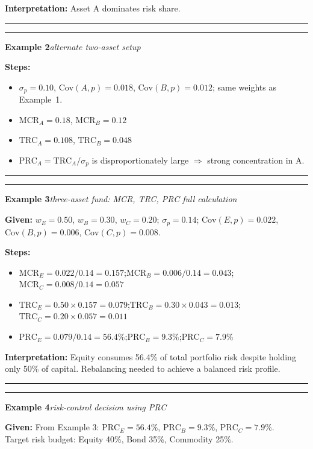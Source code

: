 \documentclass[
]{article}
\begin{document}
\noindent\textbf{Interpretation:} Asset A dominates risk share.

\noindent\rule{\linewidth}{0.4pt}
\medskip
\noindent\rule{\linewidth}{0.4pt}
\noindent\textbf{Example 2}\enspace\textit{alternate two-asset setup}

\noindent\textbf{Steps:}
\begin{itemize}\setlength{\itemsep}{3pt}
  \item $\sigma_p=0.10$,\; $\text{Cov}(A,p)=0.018$,\; $\text{Cov}(B,p)=0.012$; same weights as Example~1.
  \item $\text{MCR}_A=0.18$,\; $\text{MCR}_B=0.12$
  \item $\text{TRC}_A=0.108$,\; $\text{TRC}_B=0.048$
  \item $\text{PRC}_A = \text{TRC}_A/\sigma_p$ is disproportionately large $\Rightarrow$ strong concentration in A.
\end{itemize}

\noindent\rule{\linewidth}{0.4pt}
\medskip
\noindent\rule{\linewidth}{0.4pt}
\noindent\textbf{Example 3}\enspace\textit{three-asset fund: MCR, TRC, PRC full calculation}

\noindent\textbf{Given:} $w_E=0.50$, $w_B=0.30$, $w_C=0.20$; $\sigma_p=0.14$;
$\text{Cov}(E,p)=0.022$, $\text{Cov}(B,p)=0.006$, $\text{Cov}(C,p)=0.008$.

\noindent\textbf{Steps:}
\begin{itemize}\setlength{\itemsep}{3pt}
  \item $\text{MCR}_E = 0.022/0.14 = 0.157$;\quad $\text{MCR}_B = 0.006/0.14 = 0.043$;\quad $\text{MCR}_C = 0.008/0.14 = 0.057$
  \item $\text{TRC}_E = 0.50\times0.157 = 0.079$;\quad $\text{TRC}_B = 0.30\times0.043 = 0.013$;\quad $\text{TRC}_C = 0.20\times0.057 = 0.011$
  \item $\text{PRC}_E = 0.079/0.14 = 56.4\%$;\quad $\text{PRC}_B = 9.3\%$;\quad $\text{PRC}_C = 7.9\%$
\end{itemize}

\noindent\textbf{Interpretation:} Equity consumes 56.4\% of total portfolio risk despite holding only 50\% of capital. Rebalancing needed to achieve a balanced risk profile.

\noindent\rule{\linewidth}{0.4pt}
\medskip
\noindent\rule{\linewidth}{0.4pt}
\noindent\textbf{Example 4}\enspace\textit{risk-control decision using PRC}

\noindent\textbf{Given:} From Example 3: $\text{PRC}_E=56.4\%$, $\text{PRC}_B=9.3\%$, $\text{PRC}_C=7.9\%$.\\
Target risk budget: Equity 40\%, Bond 35\%, Commodity 25\%.
\end{document}
